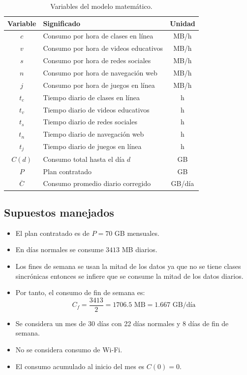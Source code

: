 \documentclass[12pt,a4paper]{article}
\begin{document}
	\begin{table}[H]
		\centering
		\renewcommand{\arraystretch}{1.3}
		\begin{tabular}{|c|p{7cm}|c|}
			\hline
			\rowcolor{azulclaro}
			\textbf{Variable} & \textbf{Significado} & \textbf{Unidad} \\ \hline
			$c$ & Consumo por hora de clases en línea & MB/h \\ \hline
			$v$ & Consumo por hora de videos educativos & MB/h \\ \hline
			$s$ & Consumo por hora de redes sociales & MB/h \\ \hline
			$n$ & Consumo por hora de navegación web & MB/h \\ \hline
			$j$ & Consumo por hora de juegos en línea & MB/h \\ \hline
			$t_c$ & Tiempo diario de clases en línea & h \\ \hline
			$t_v$ & Tiempo diario de videos educativos & h \\ \hline
			$t_s$ & Tiempo diario de redes sociales & h \\ \hline
			$t_n$ & Tiempo diario de navegación web & h \\ \hline
			$t_j$ & Tiempo diario de juegos en línea & h \\ \hline
			$C(d)$ & Consumo total hasta el día $d$ & GB \\ \hline
			$P$ & Plan contratado & GB \\ \hline
			$\overline{C}$ & Consumo promedio diario corregido & GB/día \\ \hline
		\end{tabular}
		\caption{Variables del modelo matemático.}
	\end{table}
	
	\subsection{Supuestos manejados}
	
	\begin{itemize}
		\item El plan contratado es de $P=70$ GB mensuales.
		\item En días normales se consume $3413$ MB diarios.
		\item Los fines de semana se usan la mitad de los datos ya que no se tiene clases sincrónicas entonces se infiere que se consume la mitad de los datos diarios.
		\item Por tanto, el consumo de fin de semana es:
		\[
		C_f=\frac{3413}{2}=1706.5\text{ MB}=1.667\text{ GB/día}
		\]
		\item Se considera un mes de 30 días con 22 días normales y 8 días de fin de semana.
		\item No se considera consumo de Wi-Fi.
		\item El consumo acumulado al inicio del mes es $C(0)=0$.
	\end{itemize}
	
\end{document}
